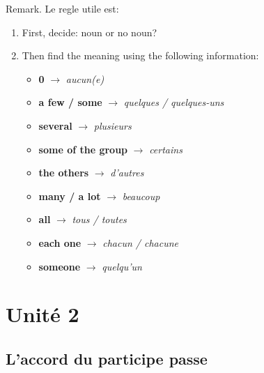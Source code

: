 \documentclass[math,code]{amznotes}
\theoremstyle{remark}
\begin{document}
\begin{enumerate}
    \begin{notebox}
        Remark. Le regle utile est:
        \begin{enumerate}
            \item First, decide: noun or no noun?
            \item Then find the meaning using the following information:
            \begin{itemize}
                \item \textbf{0} $\rightarrow$ \textit{aucun(e)}
                \item \textbf{a few / some} $\rightarrow$ \textit{quelques / quelques-uns}
                \item \textbf{several} $\rightarrow$ \textit{plusieurs}
                \item \textbf{some of the group} $\rightarrow$ \textit{certains}
                \item \textbf{the others} $\rightarrow$ \textit{d'autres}
                \item \textbf{many / a lot} $\rightarrow$ \textit{beaucoup}
                \item \textbf{all} $\rightarrow$ \textit{tous / toutes}
                \item \textbf{each one} $\rightarrow$ \textit{chacun / chacune}
                \item \textbf{someone} $\rightarrow$ \textit{quelqu'un}
            \end{itemize}
        \end{enumerate}
    \end{notebox}
\end{enumerate}

\chapter{Unité 2}

\section{L'accord du participe passe}
\label{sec:l'accord-du-pp}
\end{document}
